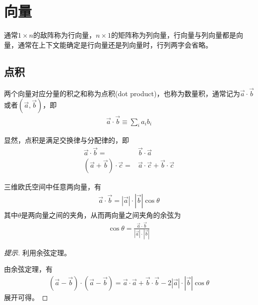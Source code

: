\section{向量}
\label{sec:vector}

通常$1\times n$的敌阵称为行向量，$n\times 1$的矩阵称为列向量，行向量与列向量都是向量，通常在上下文能确定是行向量还是列向量时，行列两字会省略。

\subsection{点积}
\label{sec:dot-product-of-vector}
\begin{definition}
  两个向量对应分量的积之和称为点积(dot product)，也称为数量积，通常记为$\vec a\cdot\vec b$或者$(\vec a,\vec b)$，即
  \begin{align*}
    \vec{a}\cdot \vec b\equiv\sum_i a_ib_i
  \end{align*}
\end{definition}

显然，点积是满足交换律与分配律的，即
\begin{align*}
  \vec a\cdot \vec b={}&\vec b\cdot \vec a\\
  (\vec a + \vec b)\cdot \vec c ={}& \vec a\cdot \vec c + \vec b\cdot \vec c
\end{align*}

\begin{theorem}
  三维欧氏空间中任意两向量，有
  \begin{align*}
    \vec{a}\cdot \vec b=\left|\vec a\right| \cdot \left|\vec b\right| \cos\theta
  \end{align*}
  其中$\theta$是两向量之间的夹角，从而两向量之间夹角的余弦为
  \begin{align*}
    \cos\theta = \frac{\vec a\cdot \vec b}{\left|\vec a\right| \cdot \left|\vec b\right|}
  \end{align*}
\end{theorem}
\begin{proof}[提示]
  利用余弦定理。
  \begin{center}
  \end{center}
  由余弦定理，有
  \begin{align*}
    (\vec a-\vec b)\cdot(\vec a-\vec b) = \vec a\cdot \vec a + \vec b\cdot\vec b
    - 2\left|\vec a\right|\cdot\left|\vec b\right|\cos\theta
  \end{align*}
  展开可得。
\end{proof}

